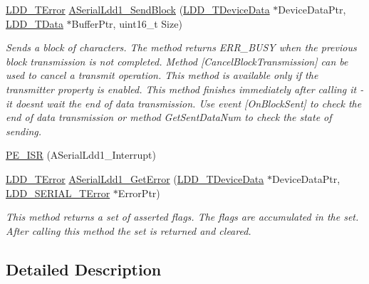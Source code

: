 \begin{DoxyCompactItemize}
\hyperlink{group___p_e___types__module_ga24c2b045fd04e79e85f261ce4df35588}{L\+D\+D\+\_\+\+T\+Error} \hyperlink{group___a_serial_ldd1__module_gad73f06e0eda26a76d0ec611a50e16b1d}{A\+Serial\+Ldd1\+\_\+\+Send\+Block} (\hyperlink{group___p_e___types__module_gac5cf1362f1f0e3a2ce71b1bf2276d091}{L\+D\+D\+\_\+\+T\+Device\+Data} $\ast$Device\+Data\+Ptr, \hyperlink{group___p_e___types__module_gade8ef9401405bd941b6da738b807f980}{L\+D\+D\+\_\+\+T\+Data} $\ast$Buffer\+Ptr, uint16\+\_\+t Size)
\begin{DoxyCompactList}\small\item\em Sends a block of characters. The method returns E\+R\+R\+\_\+\+B\+U\+SY when the previous block transmission is not completed. Method \mbox{[}Cancel\+Block\+Transmission\mbox{]} can be used to cancel a transmit operation. This method is available only if the transmitter property is enabled. This method finishes immediately after calling it -\/ it doesn\textquotesingle{}t wait the end of data transmission. Use event \mbox{[}On\+Block\+Sent\mbox{]} to check the end of data transmission or method Get\+Sent\+Data\+Num to check the state of sending. \end{DoxyCompactList}\item 
\hyperlink{group___a_serial_ldd1__module_gaef4af12ca5f10beafaceb800c3c7d40c}{P\+E\+\_\+\+I\+SR} (A\+Serial\+Ldd1\+\_\+\+Interrupt)
\item 
\hyperlink{group___p_e___types__module_ga24c2b045fd04e79e85f261ce4df35588}{L\+D\+D\+\_\+\+T\+Error} \hyperlink{group___a_serial_ldd1__module_gaac860ccc68e9f89fb25d97ae0c56bd87}{A\+Serial\+Ldd1\+\_\+\+Get\+Error} (\hyperlink{group___p_e___types__module_gac5cf1362f1f0e3a2ce71b1bf2276d091}{L\+D\+D\+\_\+\+T\+Device\+Data} $\ast$Device\+Data\+Ptr, \hyperlink{group___p_e___types__module_ga3bd5d57e02458ce220540d0ad0462e06}{L\+D\+D\+\_\+\+S\+E\+R\+I\+A\+L\+\_\+\+T\+Error} $\ast$Error\+Ptr)
\begin{DoxyCompactList}\small\item\em This method returns a set of asserted flags. The flags are accumulated in the set. After calling this method the set is returned and cleared. \end{DoxyCompactList}\end{DoxyCompactItemize}


\subsection{Detailed Description}


